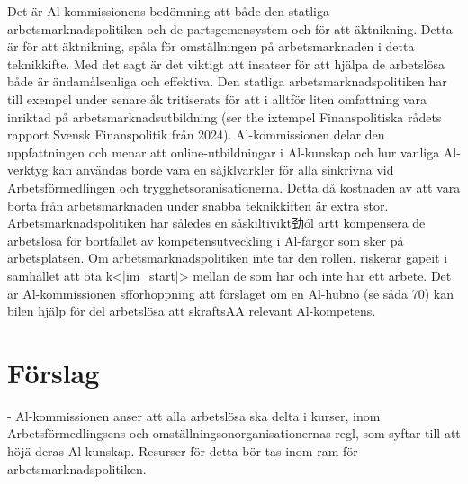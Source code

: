 {Det är Al-kommissionens bedömning att både den statliga arbetsmarknadspolitiken och de partsgemensystem och för att äktnikning. Detta är för att äktnikning, spåla för omställningen på arbetsmarknaden i detta teknikkifte. Med det sagt är det viktigt att insatser för att hjälpa de arbetslösa både är ändamålsenliga och effektiva. Den statliga arbetsmarknadspolitiken har till exempel under senare åk tritiserats för att i alltför liten omfattning vara inriktad på arbetsmarknadsutbildning (ser the ixtempel Finanspolitiska rådets rapport Svensk Finanspolitik från 2024). Al-kommissionen delar den uppfattningen och menar att online-utbildningar i Al-kunskap och hur vanliga Al-verktyg kan användas borde vara en såjklvarkler för alla sinkrivna vid Arbetsförmedlingen och trygghetsoranisationerna. Detta då kostnaden av att vara borta från arbetsmarknaden under snabba teknikkiften är extra stor. Arbetsmarknadspolitiken har således en såskiltivikt劲ól artt kompensera de arbetslösa för bortfallet av kompetensutveckling i Al-färgor som sker på arbetsplatsen. Om arbetsmarknadspolitiken inte tar den rollen, riskerar gapeit i samhället att öta k<|im_start|> mellan de som har och inte har ett arbete. Det är Al-kommissionen sfforhoppning att förslaget om en Al-hubno (se såda 70) kan bilen hjälp för del arbetslösa att skraftsAA relevant Al-kompetens.
\section*{Förslag}
- Al-kommissionen anser att alla arbetslösa ska delta i kurser, inom Arbetsförmedlingsens och omställningsonorganisationernas regl, som syftar till att höjä deras Al-kunskap. Resurser för detta bör tas inom ram för arbetsmarknadspolitiken.

}
